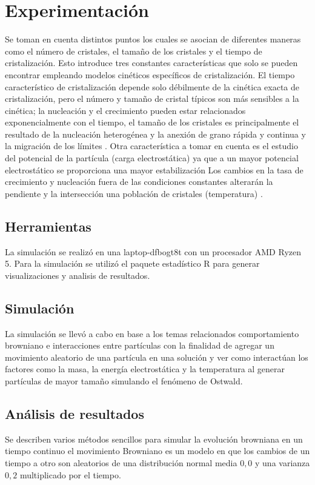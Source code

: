 \documentclass[3pt,twocolumn]{elsarticle}
\begin{document}
\section{Experimentaci\'on}
Se toman en cuenta distintos puntos los cuales se asocian de diferentes maneras como el número de cristales, el tamaño de los cristales y el tiempo de cristalización. Esto introduce tres constantes características que solo se pueden encontrar empleando modelos cinéticos específicos de cristalización. El tiempo característico de cristalización depende solo débilmente de la cinética exacta de cristalización, pero el número y tamaño de cristal típicos son más sensibles a la cinética; la nucleación y el crecimiento pueden estar relacionados exponencialmente con el tiempo, el tamaño de los cristales es principalmente el resultado de la nucleación heterogénea y la anexión de grano rápida y continua y la migración de los límites \cite{a8}. Otra característica a tomar en cuenta es el estudio del potencial de la partícula (carga electrostática) ya que a un mayor potencial electrostático se proporciona una mayor estabilización \cite{a11,a12} Los cambios en la tasa de crecimiento y nucleación fuera de las condiciones constantes alterarán la pendiente y la intersección una población de cristales (temperatura) \cite{a13}. 

\subsection{Herramientas}
La simulación se realizó en una laptop-dfbogt8t con un procesador AMD Ryzen 5. Para la simulación se utilizó el paquete estadístico R  \cite{R} para generar visualizaciones y analisis de resultados.

\subsection{Simulaci\'on}
La simulación se llevó a cabo en base a los temas relacionados comportamiento browniano \cite{p1} e interacciones entre partículas \cite{p7} con la finalidad de agregar un movimiento aleatorio de una partícula en una solución y ver como interactúan los factores como la masa, la energía electrostática y la temperatura al generar partículas de mayor tamaño simulando el fenómeno de Ostwald.

\subsection{An\'alisis de resultados}
Se describen varios métodos sencillos para simular la evolución browniana en un tiempo continuo el movimiento Browniano es un modelo en que los cambios de un tiempo a otro son aleatorios de una distribución normal media $0,0$ y una varianza $0,2$ multiplicado por el tiempo. 
\end{document}
